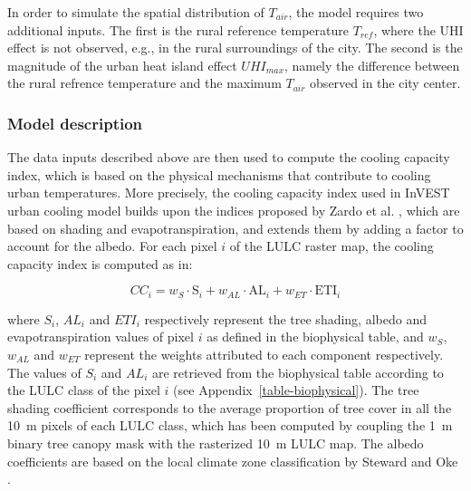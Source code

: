 \documentclass[10pt,letterpaper]{article}
\begin{document}
In order to simulate the spatial distribution of $T_{air}$, the model requires two additional inputs. The first is the rural reference temperature $T_{ref}$, where the UHI effect is not observed, e.g., in the rural surroundings of the city. The second is the magnitude of the urban heat island effect $UHI_{max}$, namely the difference between the rural refrence temperature and the maximum $T_{air}$ observed in the city center.



\subsubsection*{Model description}

The data inputs described above are then used to compute the cooling capacity index, which is based on the physical mechanisms that contribute to cooling urban temperatures. More precisely, the cooling capacity index used in InVEST urban cooling model builds upon the indices proposed by Zardo et al. \cite{zardo2017estimating}, which are based on shading and evapotranspiration, and extends them by adding a factor to account for the albedo.
For each pixel $i$ of the LULC raster map, the cooling capacity index is computed as in:

\begin{equation}
  \label{eq:cooling-capacity}
  CC_i = w_{S} \cdot \textrm{S}_i + w_{AL} \cdot \textrm{AL}_i + w_{ET} \cdot \textrm{ETI}_i
\end{equation}

where $S_i$, $AL_i$ and $ETI_i$ respectively represent the tree shading, albedo and evapotranspiration values of pixel $i$ as defined in the biophysical table, and $w_{S}$, $w_{AL}$ and $w_{ET}$ represent the weights attributed to each component respectively.
The values of $S_i$ and $AL_i$ are retrieved from the biophysical table according to the LULC class of the pixel $i$ (see Appendix~\ref{table-biophysical}).
The tree shading coefficient corresponds to the average proportion of tree cover in all the 10~m pixels of each LULC class, which has been computed by coupling the 1~m binary tree canopy mask with the rasterized 10~m LULC map.
The albedo coefficients are based on the local climate zone classification by Steward and Oke \cite{stewart2012local}.

\end{document}
